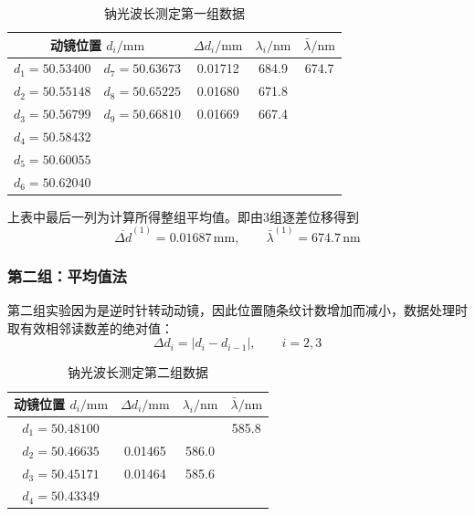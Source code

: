 \documentclass[10pt,a4paper]{ctexart} %
\begin{document}
  \begin{table}[H]
    \centering
    \caption{钠光波长测定第一组数据}
    \label{tab:wavelength-first}
    \begin{tabular}{ccccc}
      \toprule
      \multicolumn{2}{c}{动镜位置 $d_i/\mathrm{mm}$}
      & $\Delta d_i/\mathrm{mm}$ & $\lambda_i/\mathrm{nm}$ & $\bar{\lambda}/\mathrm{nm}$ \\
      \midrule
        $d_1=50.53400$ & $d_7=50.63673$ & 0.01712 & 684.9 & 674.7 \\
        $d_2=50.55148$ & $d_8=50.65225$ & 0.01680 & 671.8 &  \\
        $d_3=50.56799$ & $d_9=50.66810$ & 0.01669 & 667.4 &  \\
        $d_4=50.58432$ & & & & \\
        $d_5=50.60055$ & & & & \\
        $d_6=50.62040$ & & & & \\
      \bottomrule
    \end{tabular}
  \end{table}

  上表中最后一列为计算所得整组平均值。即由3组逐差位移得到
  \[
    \overline{\Delta d}^{(1)}=0.01687\,\mathrm{mm},\qquad
    \bar\lambda^{(1)}=674.7\,\mathrm{nm}
  \]

  \subsubsection{第二组：平均值法}
  第二组实验因为是逆时针转动动镜，因此位置随条纹计数增加而减小，数据处理时取有效相邻读数差的绝对值：
  \[
    \Delta d_i=|d_i-d_{i-1}|,\qquad i=2,3
  \]

  \begin{table}[H]
    \centering
    \caption{钠光波长测定第二组数据}
    \label{tab:wavelength-second}
    \begin{tabular}{cccc}
      \toprule
      动镜位置 $d_i/\mathrm{mm}$ & $\Delta d_i/\mathrm{mm}$
      & $\lambda_i/\mathrm{nm}$ & $\bar{\lambda}/\mathrm{nm}$ \\
      \midrule
        $d_1=50.48100$ & & & 585.8 \\
        $d_2=50.46635$ & 0.01465 & 586.0 & \\
        $d_3=50.45171$ & 0.01464 & 585.6 & \\
        $d_4=50.43349$ & & & \\
      \bottomrule
    \end{tabular}
  \end{table}
\end{document}
